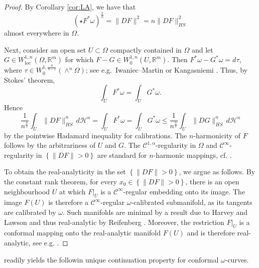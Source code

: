 \documentclass[a4paper,leqno,11pt]{amsart}
\numberwithin{equation}{section}
\theoremstyle{remark}
\theoremstyle{remark}
\newcommand{\R}{\mathbb{R}}
\DeclareMathOperator{\loc}{loc}
\begin{document}
\begin{proof}
By Corollary \ref{cor:LA}, we have that 
\begin{equation}\label{eq:keyinequality}
    ( \star F^{*}\omega )^{ \frac{2}{n} } = \|DF\|^2 = n \|DF\|_{HS}^2
\end{equation}
almost everywhere in $\Omega$.

Next, consider an open set $U \subset \Omega$ compactly contained in $\Omega$ and let $G \in W^{1,n}_{\loc}(\Omega,\R^m)$ for which $F - G \in W^{1,n}_{0}( U, \mathbb{R}^m )$. Then $F^*\omega - G^*\omega = d\tau$, where $\tau \in W^{1,\frac{n}{n-1}}_0(\wedge^n \Omega)$; see e.g.~Iwaniec--Martin \cite{Iwa:Mar:93} or Kangasniemi \cite{Kan:21}.  Thus, by Stokes' theorem,
\[
\int_U F^*\omega = \int_U G^*\omega.
\]
Hence
\begin{equation}
\label{eq:fixed}
    \frac{ 1 }{ n^{ \frac{n}{2} } }
    \int_{ U } \|DF\|^{n}_{HS} \,d\mathcal{H}^n
    =
    \int_{ U } F^{*}\omega 
    =
    \int_{U} G^{*}\omega 
    \leq
    \frac{ 1 }{ n^{ \frac{n}{2} } }
    \int_{ U } \|DG\|^{n}_{HS} \,d\mathcal{H}^n
\end{equation}
by the pointwise Hadamard inequality for calibrations. The $n$-harmonicity of $F$ follows by the arbitrariness of $U$ and $G$. The $\mathcal{C}^{1,\alpha}$-regularity in $\Omega$ and $\mathcal{C}^{\infty}$-regularity in $\left\{ \|DF\| > 0 \right\}$ are standard for $n$-harmonic mappings, cf. \cite{Uhl:77,Har:Lin:87}.

To obtain the real-analyticity in the set $\left\{ \|DF\| > 0 \right\}$, we argue as follows. By the constant rank theorem, for every $x_0 \in \left\{ \|DF\| > 0 \right\}$, there is an open neighbourhood $U$ at which $F|_{U}$ is a $\mathcal{C}^{\infty}$-regular embedding onto its image. The image $F(U)$ is therefore a $\mathcal{C}^{\infty}$-regular $\omega$-calibrated submanifold, as its tangents are calibrated by $\omega$. Such manifolds are minimal by a result due to Harvey and Lawson \cite[Corollary 4.6]{Har:Law:82} and thus real-analytic by Reifenberg \cite{Reif:64}. Moreover, the restriction $F|_{U}$ is a conformal mapping onto the real-analytic manifold $F(U)$ and is therefore real-analytic, see e.g. \cite[Proposition A.3]{Las:Lii:Sal:22}.
\end{proof}


 readily yields the followin unique continuation property for conformal $\omega$-curves.
\end{document}
